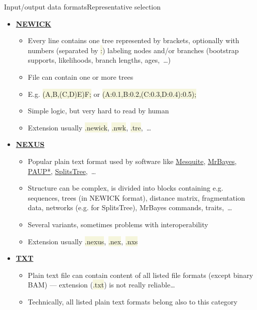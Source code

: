\documentclass[compress, xelatex, 11pt, xcolor=svgnames, aspectratio=169, url={hyphens, lowtilde}]{beamer}
\renewcommand{\texttt}[1]{\colorbox{Beige}{{\ttfamily #1}}}
\begin{document}
\begin{frame}[allowframebreaks]{Input/output data formats}{Representative selection}
\begin{itemize}
\begin{itemize}
		\end{itemize}
		\item \href{https://en.wikipedia.org/wiki/Newick_format}{\textbf{NEWICK}}
		\begin{itemize}
			\item Every line contains one tree represented by brackets, optionally with numbers (separated by \texttt{:}) labeling nodes and/or branches (bootstrap supports, likelihoods, branch lengths, ages,~\ldots)
			\item File can contain one or more trees
			\item E.g. \texttt{(A,B,(C,D)E)F;} or \texttt{(A:0.1,B:0.2,(C:0.3,D:0.4):0.5);}
			\item Simple logic, but very hard to read by human
			\item Extension usually \texttt{*.newick}, \texttt{*.nwk}, \texttt{*.tre},~\ldots
		\end{itemize}
		\item \href{https://en.wikipedia.org/wiki/Nexus_file}{\textbf{NEXUS}}
		\begin{itemize}
			\item Popular plain text format used by software like \href{https://www.mesquiteproject.org/}{Mesquite}, \href{https://nbisweden.github.io/MrBayes/}{MrBayes}, \href{https://paup.phylosolutions.com/}{PAUP*}, \href{https://uni-tuebingen.de/en/fakultaeten/mathematisch-naturwissenschaftliche-fakultaet/fachbereiche/informatik/lehrstuehle/algorithms-in-bioinformatics/software/splitstree/}{SplitsTree},~\ldots
			\item Structure can be complex, is divided into blocks containing e.g. sequences, trees (in NEWICK format), distance matrix, fragmentation data, networks (e.g. for SplitsTree), MrBayes commands, traits,~\ldots
			\item Several variants, sometimes problems with interoperability
			\item Extension usually \texttt{*.nexus}, \texttt{*.nex}, \texttt{*.nxs}
		\end{itemize}
		\item \href{https://en.wikipedia.org/wiki/Text_file}{\textbf{TXT}}
		\begin{itemize}
			\item Plain text file can contain content of all listed file formats (except binary BAM) --- extension (\texttt{*.txt}) is not really reliable\ldots
			\item Technically, all listed plain text formats belong also to this category
		\end{itemize}

\end{itemize}
\end{frame}
\end{document}

